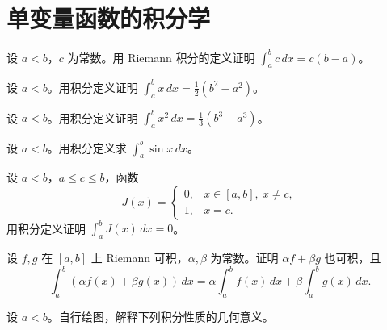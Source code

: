 \renewcommand{\thesection}{\arabic{section}}\renewcommand{\theHsection}{chapter.\arabic{section}}\setcounter{section}{4}\section{单变量函数的积分学}
\noindent\begin{minipage}{\textwidth}
设 $a<b$，$c$ 为常数。用 Riemann 积分的定义证明 $\displaystyle\int_a^b c\,dx=c(b-a)$。
\end{minipage}\par\vfill
\noindent\begin{minipage}{\textwidth}
设 $a<b$。用积分定义证明 $\displaystyle\int_a^b x\,dx=\frac12(b^2-a^2)$。
\end{minipage}\par\vfill
\noindent\begin{minipage}{\textwidth}
设 $a<b$。用积分定义证明 $\displaystyle\int_a^b x^2\,dx=\frac13(b^3-a^3)$。
\end{minipage}\par\vfill
\noindent\begin{minipage}{\textwidth}
设 $a<b$。用积分定义求 $\displaystyle\int_a^b\sin x\,dx$。
\end{minipage}\par\vfill
\newpage
\noindent\begin{minipage}{\textwidth}
设 $a<b$，$a\le c\le b$，函数\[J(x)=\begin{cases}0,&x\in[a,b],\ x\ne c,\\1,&x=c.\end{cases}\]用积分定义证明 $\displaystyle\int_a^bJ(x)\,dx=0$。
\end{minipage}\par\vfill
\noindent\begin{minipage}{\textwidth}
设 $f,g$ 在 $[a,b]$ 上 Riemann 可积，$\alpha,\beta$ 为常数。证明 $\alpha f+\beta g$ 也可积，且\[\int_a^b(\alpha f(x)+\beta g(x))\,dx=\alpha\int_a^b f(x)\,dx+\beta\int_a^b g(x)\,dx.\]
\end{minipage}\par\vfill
\noindent\begin{minipage}{\textwidth}
设 $a<b$。自行绘图，解释下列积分性质的几何意义。
\end{minipage}\par\vfill
